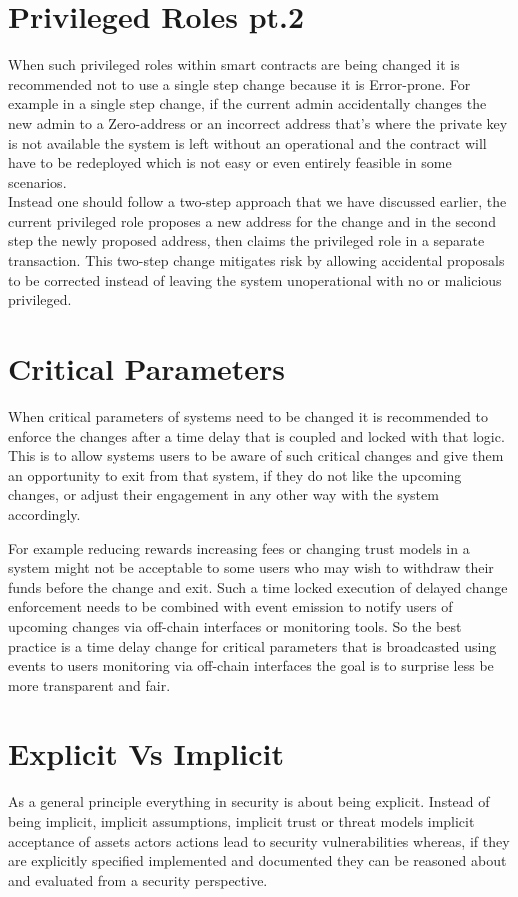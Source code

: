 \section{Privileged Roles pt.2}
When such privileged roles within smart contracts are being changed it is recommended not to use a single step change because it is Error-prone. For example in a single step change, if the current admin accidentally changes the new admin to a Zero-address or an incorrect address that's where the private key is not available the system is left without an operational and the contract will have to be redeployed which is not easy or even entirely feasible in some scenarios.\\

Instead one should follow a two-step approach that we have discussed earlier, the current privileged role proposes a new address for the change and in the second step the newly proposed address, then claims the privileged role in a separate transaction. This two-step change mitigates risk by allowing accidental proposals to be corrected instead of leaving the system unoperational with no or malicious privileged.

\section{Critical Parameters}
When critical parameters of systems need to be changed it is recommended to enforce the changes after a time delay that is coupled and locked with that logic. This is to allow systems users to be aware of such critical changes and give them an opportunity to exit from that system, if they do not like the upcoming changes, or adjust their engagement in any other way with the system accordingly. 

For example reducing rewards increasing fees or changing trust models in a system might not be acceptable to some users who may wish to withdraw their funds before the change and exit. Such a time locked execution of delayed change enforcement needs to be combined with event emission to notify users of upcoming changes via off-chain interfaces or monitoring tools. So the best practice is a time delay change for critical parameters that is broadcasted using events to users monitoring via off-chain interfaces the goal is to surprise less be more transparent and fair.

\section{Explicit Vs Implicit}
As a general principle everything in security is about being explicit. Instead of being implicit, implicit assumptions, implicit trust or threat models implicit acceptance of assets actors actions lead to security vulnerabilities whereas, if they are explicitly specified implemented and documented they can be reasoned about and evaluated from a security perspective.\\

